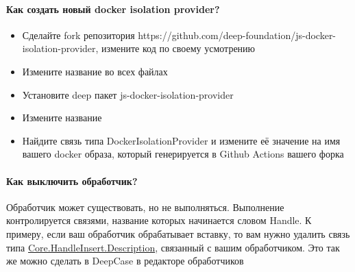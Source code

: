 \paragraph{Как создать новый docker isolation provider?}
\begin{itemize}
      \item Сделайте fork репозитория https://github.com/deep-foundation/js-docker-isolation-provider, измените код по своему усмотрению
      \item Измените название во всех файлах
      \item Установите deep пакет js-docker-isolation-provider
      \item Измените название
      \item Найдите связь типа DockerIsolationProvider и измените её значение на имя вашего docker образа, который генерируется в Github Actions вашего форка
\end{itemize}
\paragraph{Как выключить обработчик?}
Обработчик может существовать, но не выполняться. Выполнение контролируется связями, название которых начинается словом Handle. К примеру, если ваш обработчик обрабатывает вставку, то вам нужно удалить связь типа \hyperlink{HandleInsert}{Core.HandleInsert.Description}, связанный с вашим обработчиком. Это так же можно сделать в DeepCase в редакторе обработчиков
